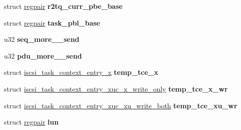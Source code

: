 \begin{DoxyCompactItemize}
\item 
\hypertarget{structxstorm__iscsi__context__section_af2a58b3417a36a8dde48e8757de9cd9b}{
struct \hyperlink{structregpair}{regpair} {\bfseries r2tq\_\-curr\_\-pbe\_\-base}}
\label{structxstorm__iscsi__context__section_af2a58b3417a36a8dde48e8757de9cd9b}

\item 
\hypertarget{structxstorm__iscsi__context__section_aaa11cda811e09cd20c29e57961425e1a}{
struct \hyperlink{structregpair}{regpair} {\bfseries task\_\-pbl\_\-base}}
\label{structxstorm__iscsi__context__section_aaa11cda811e09cd20c29e57961425e1a}

\item 
\hypertarget{structxstorm__iscsi__context__section_a7807c03b101c66a5b9cc274df87d2ce0}{
u32 {\bfseries seq\_\-more\_\_\-send}}
\label{structxstorm__iscsi__context__section_a7807c03b101c66a5b9cc274df87d2ce0}

\item 
\hypertarget{structxstorm__iscsi__context__section_a5123e1482319cb93c7ae71cb06293b08}{
u32 {\bfseries pdu\_\-more\_\_\-send}}
\label{structxstorm__iscsi__context__section_a5123e1482319cb93c7ae71cb06293b08}

\item 
\hypertarget{structxstorm__iscsi__context__section_aa5f04c2957c261289f839de3d966fb6e}{
struct \hyperlink{structiscsi__task__context__entry__x}{iscsi\_\-task\_\-context\_\-entry\_\-x} {\bfseries temp\_\-tce\_\-x}}
\label{structxstorm__iscsi__context__section_aa5f04c2957c261289f839de3d966fb6e}

\item 
\hypertarget{structxstorm__iscsi__context__section_a7e3757dc46b707e0bb815d3859c1cba4}{
struct \hyperlink{structiscsi__task__context__entry__xuc__x__write__only}{iscsi\_\-task\_\-context\_\-entry\_\-xuc\_\-x\_\-write\_\-only} {\bfseries temp\_\-tce\_\-x\_\-wr}}
\label{structxstorm__iscsi__context__section_a7e3757dc46b707e0bb815d3859c1cba4}

\item 
\hypertarget{structxstorm__iscsi__context__section_aaca0b163dae9335397ccc889791ea16c}{
struct \hyperlink{structiscsi__task__context__entry__xuc__xu__write__both}{iscsi\_\-task\_\-context\_\-entry\_\-xuc\_\-xu\_\-write\_\-both} {\bfseries temp\_\-tce\_\-xu\_\-wr}}
\label{structxstorm__iscsi__context__section_aaca0b163dae9335397ccc889791ea16c}

\item 
\hypertarget{structxstorm__iscsi__context__section_a628d4d3736465a4b9b145dca5fe9fed3}{
struct \hyperlink{structregpair}{regpair} {\bfseries lun}}
\label{structxstorm__iscsi__context__section_a628d4d3736465a4b9b145dca5fe9fed3}


\end{DoxyCompactItemize}
